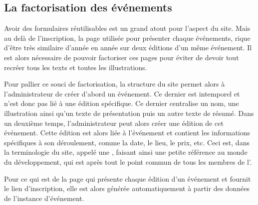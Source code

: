 \subsection{La factorisation des événements}
\label{subsec:factorisation-evenements}

Avoir des formulaires réutilisables est un grand atout pour l'aspect  du site. Mais au delà de l'inscription, la page utilisée pour présenter chaque événements, rique d'être très similaire d'année en année sur deux éditions d'un même événement. Il est alors nécessaire de pouvoir factoriser ces pages pour éviter de devoir tout recréer tous les texts et toutes les illustrations.
\bigskip

Pour pallier ce souci de factorisation, la structure du site permet alors à l'administrateur de créer d'abord un événement. Ce dernier est intemporel et n'est donc pas lié à une édition spécifique. Ce dernier centralise un nom, une illustration ainsi qu'un texte de présentation puis un autre texte de résumé. Dans un deuxième temps, l'administrateur peut alors créer une édition de cet événement. Cette édition est alors liée à l'événement et contient les informations spécifiques à son déroulement, comme la date, le lieu, le prix, etc. Ceci est, dans la terminologie du site, appelé une , faisant ainsi une petite référence au monde du développement, qui est après tout le point commun de tous les membres de l'\ofni.

Pour ce qui est de la page qui présente chaque édition d'un événement et fournit le lien d'inscription, elle est alors générée automatiquement à partir des données de l'instance d'événement.

